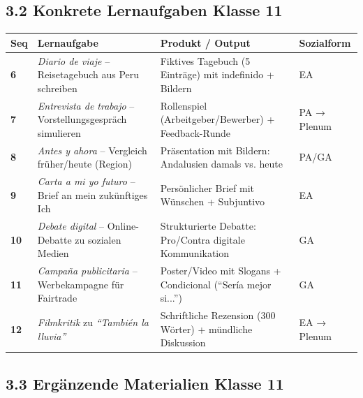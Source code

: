 \documentclass[11pt, a4paper]{article}
\newcommand{\es}[1]{\textit{#1}}
\begin{document}
\subsection*{3.2 Konkrete Lernaufgaben Klasse 11}

\begin{tabularx}{\textwidth}{|C{0.8cm}|L{4cm}|X|C{2cm}|}
\hline
{}
\textbf{Seq} & \textbf{Lernaufgabe} & \textbf{Produkt / Output} & \textbf{Sozialform} \\
\hline
\textbf{6} & \es{Diario de viaje} -- Reisetagebuch aus Peru schreiben &
Fiktives Tagebuch (5 Einträge) mit indefinido + Bildern &
EA \\
\hline
\textbf{7} & \es{Entrevista de trabajo} -- Vorstellungsgespräch simulieren &
Rollenspiel (Arbeitgeber/Bewerber) + Feedback-Runde &
PA → Plenum \\
\hline
\textbf{8} & \es{Antes y ahora} -- Vergleich früher/heute (Region) &
Präsentation mit Bildern: Andalusien damals vs. heute &
PA/GA \\
\hline
\textbf{9} & \es{Carta a mi yo futuro} -- Brief an mein zukünftiges Ich &
Persönlicher Brief mit Wünschen + Subjuntivo &
EA \\
\hline
\textbf{10} & \es{Debate digital} -- Online-Debatte zu sozialen Medien &
Strukturierte Debatte: Pro/Contra digitale Kommunikation &
GA \\
\hline
\textbf{11} & \es{Campaña publicitaria} -- Werbekampagne für Fairtrade &
Poster/Video mit Slogans + Condicional (``Sería mejor si...'') &
GA \\
\hline
\textbf{12} & \es{Filmkritik} zu \es{``También la lluvia''} &
Schriftliche Rezension (300 Wörter) + mündliche Diskussion &
EA → Plenum \\
\hline
\end{tabularx}

\subsection*{3.3 Ergänzende Materialien Klasse 11}
\end{document}
